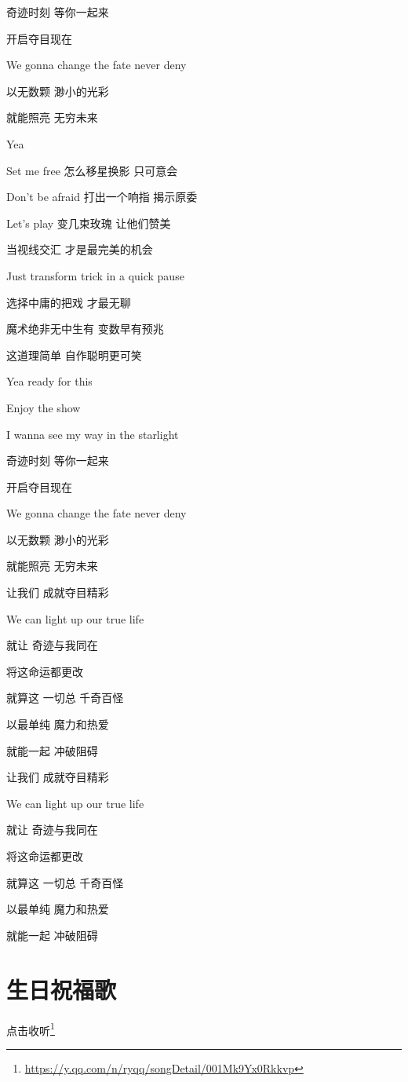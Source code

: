 \documentclass[]{ctexbook}
\renewcommand{\href}[2]{#2\footnote{\url{#1}}}
\begin{document}
奇迹时刻 等你一起来

开启夺目现在

We gonna change the fate never deny

以无数颗 渺小的光彩

就能照亮 无穷未来

Yea

Set me free 怎么移星换影 只可意会

Don't be afraid 打出一个响指 揭示原委

Let's play 变几束玫瑰 让他们赞美

当视线交汇 才是最完美的机会

Just transform trick in a quick pause

选择中庸的把戏 才最无聊

魔术绝非无中生有 变数早有预兆

这道理简单 自作聪明更可笑

Yea ready for this

Enjoy the show

I wanna see my way in the starlight

奇迹时刻 等你一起来

开启夺目现在

We gonna change the fate never deny

以无数颗 渺小的光彩

就能照亮 无穷未来

让我们 成就夺目精彩

We can light up our true life

就让 奇迹与我同在

将这命运都更改

就算这 一切总 千奇百怪

以最单纯 魔力和热爱

就能一起 冲破阻碍

让我们 成就夺目精彩

We can light up our true life

就让 奇迹与我同在

将这命运都更改

就算这 一切总 千奇百怪

以最单纯 魔力和热爱

就能一起 冲破阻碍

\section*{生日祝福歌}\label{happy-birthday}


\href{https://y.qq.com/n/ryqq/songDetail/001Mk9Yx0Rkkvp}{点击收听}
\end{document}
